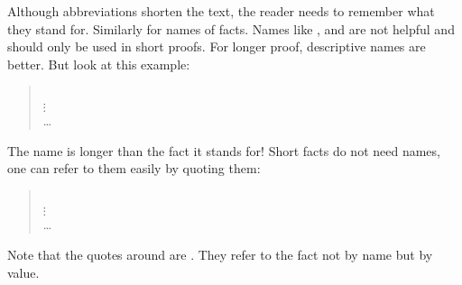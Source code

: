 \begin{isabellebody}
\begin{isamarkuptext}
Although abbreviations shorten the text, the reader needs to remember what
they stand for. Similarly for names of facts. Names like , 
and  are not helpful and should only be used in short proofs. For
longer proof, descriptive names are better. But look at this example:
\begin{quote}
 \ \\
$\vdots$\\
  \dots
\end{quote}
The name is longer than the fact it stands for! Short facts do not need names,
one can refer to them easily by quoting them:
\begin{quote}
 \ \\
$\vdots$\\
  \dots
\end{quote}
Note that the quotes around  are .
They refer to the fact not by name but by value.

\subsection{}


\end{isamarkuptext}
\end{isabellebody}
